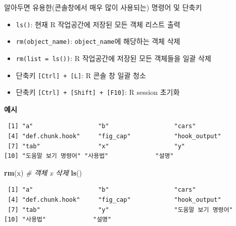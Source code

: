 \documentclass[
  11pt,
]{krantz}
\newenvironment{Shaded}{\begin{snugshade}}{\end{snugshade}}
\newcommand{\CommentTok}[1]{\textcolor[rgb]{0.37,0.37,0.37}{\textit{#1}}}
\newcommand{\DecValTok}[1]{\textcolor[rgb]{0.06,0.06,0.06}{#1}}
\newcommand{\KeywordTok}[1]{\textcolor[rgb]{0.27,0.27,0.27}{\textbf{#1}}}
\newcommand{\NormalTok}[1]{#1}
\newcommand{\OperatorTok}[1]{\textcolor[rgb]{0.43,0.43,0.43}{\textbf{#1}}}
\newcommand{\StringTok}[1]{\textcolor[rgb]{0.5,0.5,0.5}{#1}}
\providecommand{\tightlist}{%
  \setlength{\itemsep}{0pt}\setlength{\parskip}{0pt}}
\let\BeginKnitrBlock\begin \let\EndKnitrBlock\end
\begin{document}
\footnotesize

\BeginKnitrBlock{rmdtip}
알아두면 유용한(콘솔창에서 매우 많이 사용되는) 명령어 및 단축키

\begin{itemize}
\tightlist
\item
  \texttt{ls()}: 현재 R 작업공간에 저장된 모든 객체 리스트 출력
\item
  \texttt{rm(object\_name)}: \texttt{object\_name}에 해당하는 객체 삭제
\item
  \texttt{rm(list\ =\ ls())}: R 작업공간에 저장된 모든 객체들을 일괄 삭제
\item
  단축키 \texttt{{[}Ctrl{]}\ +\ {[}L{]}}: R 콘솔 창 일괄 청소
\item
  단축키 \texttt{{[}Ctrl{]}\ +\ {[}Shift{]}\ +\ {[}F10{]}}: R session 초기화
\end{itemize}

\textbf{예시}
\EndKnitrBlock{rmdtip}

\normalsize

\footnotesize

\begin{Shaded}
\end{Shaded}

\begin{verbatim}
 [1] "a"                  "b"                  "cars"              
 [4] "def.chunk.hook"     "fig_cap"            "hook_output"       
 [7] "tab"                "x"                  "y"                 
[10] "도움말 보기 명령어" "사용법"             "설명"              
\end{verbatim}

\normalsize

\footnotesize

\begin{Shaded}
\begin{Highlighting}[]
\KeywordTok{rm}\NormalTok{(x) }\CommentTok{# 객체 x 삭제}
\KeywordTok{ls}\NormalTok{()}
\end{Highlighting}
\end{Shaded}

\begin{verbatim}
 [1] "a"                  "b"                  "cars"              
 [4] "def.chunk.hook"     "fig_cap"            "hook_output"       
 [7] "tab"                "y"                  "도움말 보기 명령어"
[10] "사용법"             "설명"              
\end{verbatim}
\end{document}
